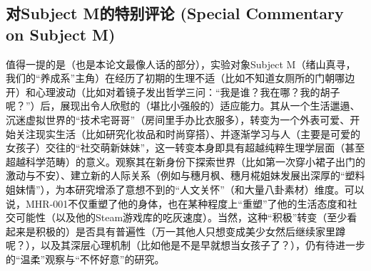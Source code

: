 \subsection{对Subject M的特别评论 (Special Commentary on Subject M)}

值得一提的是（也是本论文最像人话的部分），实验对象Subject M（绪山真寻，我们的“养成系”主角）在经历了初期的生理不适（比如不知道女厕所的门朝哪边开）和心理波动（比如对着镜子发出哲学三问：“我是谁？我在哪？我的胡子呢？”）后，展现出令人欣慰的（堪比小强般的）适应能力。其从一个生活邋遢、沉迷虚拟世界的“技术宅哥哥”（房间里手办比衣服多），转变为一个外表可爱、开始关注现实生活（比如研究化妆品和时尚穿搭）、并逐渐学习与人（主要是可爱的女孩子）交往的“社交萌新妹妹”，这一转变本身即具有超越纯粹生理学层面（甚至超越科学范畴）的意义。观察其在新身份下探索世界（比如第一次穿小裙子出门的激动与不安）、建立新的人际关系（例如与穗月枫、穗月椛姐妹发展出深厚的“塑料姐妹情”），为本研究增添了意想不到的“人文关怀”（和大量八卦素材）维度。可以说，MHR-001不仅重塑了他的身体，也在某种程度上“重塑”了他的生活态度和社交可能性（以及他的Steam游戏库的吃灰速度）。当然，这种“积极”转变（至少看起来是积极的）是否具有普遍性（万一其他人只想变成美少女然后继续家里蹲呢？），以及其深层心理机制（比如他是不是早就想当女孩子了？），仍有待进一步的“温柔”观察与“不怀好意”的研究。
